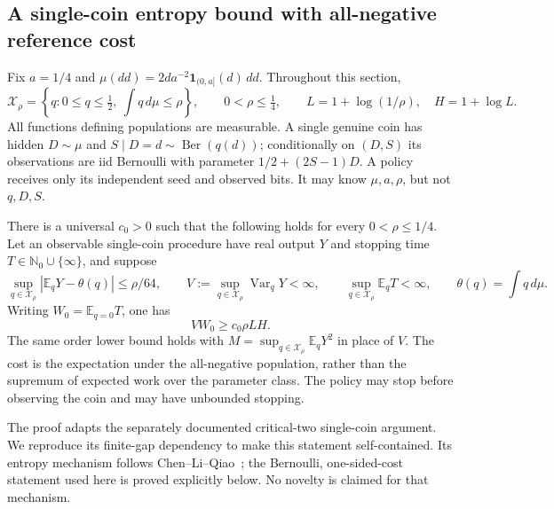 \subsection{A single-coin entropy bound with all-negative reference cost}

Fix $a=1/4$ and $\mu(dd)=2d a^{-2}\mathbf1_{(0,a]}(d)\,dd$.
Throughout this section,
\[
 \mathcal X_\rho=\left\{q:0\le q\le\tfrac12,
                    \ \int q\,d\mu\le\rho\right\},
 \qquad 0<\rho\le\tfrac14,
 \qquad L=1+\log(1/\rho),\quad H=1+\log L.
\]
All functions defining populations are measurable. A single genuine coin
has hidden $D\sim\mu$ and $S\mid D=d\sim\operatorname{Ber}(q(d))$;
conditionally on $(D,S)$ its observations are iid Bernoulli with parameter
$1/2+(2S-1)D$. A policy receives only its independent seed and observed
bits. It may know $\mu,a,\rho$, but not $q,D,S$.

\begin{theorem}
\label{crit:thm:base-cost}
There is a universal $c_0>0$ such that the following holds for every
$0<\rho\le1/4$. Let an observable single-coin procedure have real output
$Y$ and stopping time $T\in\mathbb N_0\cup\{\infty\}$, and suppose
\[
 \sup_{q\in\mathcal X_\rho}|\mathbb E_qY-\theta(q)|\le\rho/64,
 \qquad
 V:=\sup_{q\in\mathcal X_\rho}\operatorname{Var}_qY<\infty,
 \qquad
 \sup_{q\in\mathcal X_\rho}\mathbb E_qT<\infty,
 \qquad \theta(q)=\int q\,d\mu.
\]
Writing $W_0=\mathbb E_{q=0}T$, one has
\[
                 V W_0\ge c_0\rho L H.                 \tag{C.BC1}
\]
The same order lower bound holds with
$M=\sup_{q\in\mathcal X_\rho}\mathbb E_qY^2$ in place of $V$.
The cost is the expectation under the all-negative population, rather
than the supremum of expected work over the parameter class. The policy
may stop before observing the coin and may have unbounded stopping.
\end{theorem}

The proof adapts the separately documented critical-two single-coin
argument. We reproduce its finite-gap dependency to make this statement
self-contained. Its entropy mechanism follows
Chen--Li--Qiao~\cite[Lemma~4.1]{clq}; the Bernoulli, one-sided-cost statement used
here is proved explicitly below. No novelty is claimed for that mechanism.

